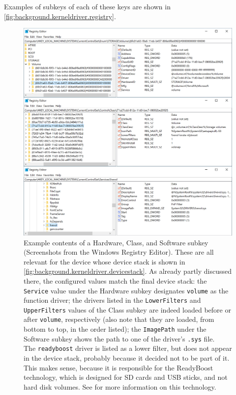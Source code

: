 Examples of subkeys of each of these keys are shown in \autoref{fig:background.kerneldriver.registry}.

\begin{figure}[htb!]
	\center
	
	\includegraphics[scale=0.65]{../img/background.kerneldriver.registry.png}
	\caption[
		Example contents of a Hardware, Class, and Software subkey
	]{
		Example contents of a Hardware, Class, and Software subkey (Screenshots from the Windows Registry Editor). These are all relevant for the device whose device stack is shown in \autoref{fig:background.kerneldriver.devicestack}. As already partly discussed there, the configured values match the final device stack: the \texttt{Service} value under the Hardware subkey designates \texttt{volume} as the function driver; the drivers listed in the \texttt{LowerFilters} and \texttt{UpperFilters} values of the Class subkey are indeed loaded before or after \texttt{volume}, respectively (also note that they are loaded, from bottom to top, in the order listed); the \texttt{ImagePath} under the Software subkey shows the path to one of the driver's \texttt{.sys} file.\\
		The \texttt{readyboost} driver is listed as a lower filter, but does not appear in the device stack, probably because it decided not to be part of it. This makes sense, because it is responsible for the ReadyBoost technology, which is designed for SD cards and USB sticks, and not hard disk volumes. See \cite{Yosifovich2017} for more information on this technology.
	}
	\label{fig:background.kerneldriver.registry}
\end{figure}

